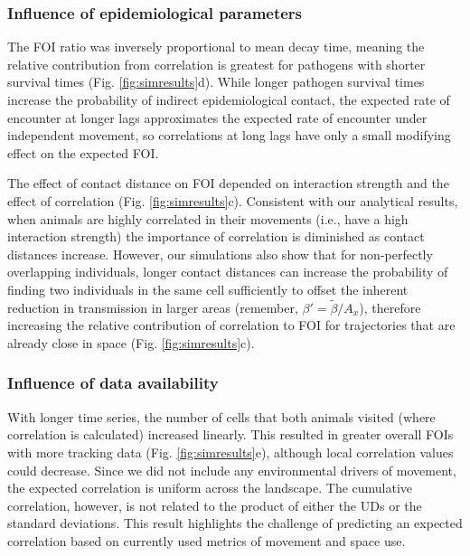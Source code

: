 \documentclass[letterpaper]{article}
\begin{document}
\subsubsection*{Influence of epidemiological parameters}

The FOI ratio was inversely proportional to mean decay time, meaning the relative contribution from correlation is greatest for pathogens with shorter survival times (Fig. \ref{fig:simresults}d). While longer pathogen survival times increase the probability of indirect epidemiological contact, the expected rate of encounter at longer lags approximates the expected rate of encounter under independent movement, so correlations at long lags have only a small modifying effect on the expected FOI. 

The effect of contact distance on FOI depended on interaction strength and the effect of correlation (Fig. \ref{fig:simresults}c). Consistent with our analytical results, when animals are highly correlated in their movements (i.e., have a high interaction strength) the importance of correlation is diminished as contact distances increase.
However, our simulations also show that for non-perfectly overlapping individuals, longer contact distances can increase the probability of finding two individuals in the same cell sufficiently to offset the inherent reduction in transmission in larger areas (remember, $\beta' = \tilde{\beta} / A_x$), therefore increasing the relative contribution of correlation to FOI for trajectories that are already close in space (Fig. \ref{fig:simresults}c).

\subsubsection*{Influence of data availability}

 
With longer time series, the number of cells that both animals visited (where correlation is calculated) increased linearly. This resulted in greater overall FOIs with more tracking data (Fig. \ref{fig:simresults}e), although local correlation values could decrease. 
Since we did not include any environmental drivers of movement, the expected correlation is uniform across the landscape. The cumulative correlation, however, is not related to the product of either the UDs or the standard deviations. This result highlights the challenge of predicting an expected correlation based on currently used metrics of movement and space use.

\end{document}
